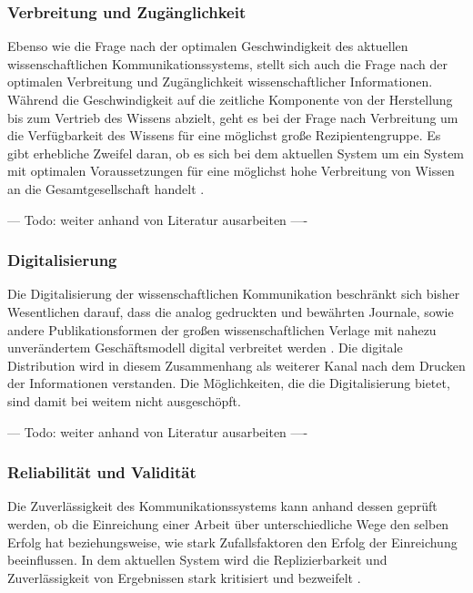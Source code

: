 \subsubsection{Verbreitung und Zugänglichkeit}

Ebenso wie die Frage nach der optimalen Geschwindigkeit des aktuellen wissenschaftlichen Kommunikationssystems, stellt sich auch die Frage nach der optimalen Verbreitung und Zugänglichkeit wissenschaftlicher Informationen. Während die Geschwindigkeit auf die zeitliche Komponente von der Herstellung bis zum Vertrieb des Wissens abzielt, geht es bei der Frage nach Verbreitung um die Verfügbarkeit des Wissens für eine möglichst große Rezipientengruppe. Es gibt erhebliche Zweifel daran, ob es sich bei dem aktuellen System um ein System mit optimalen Voraussetzungen für eine möglichst hohe Verbreitung von Wissen an die Gesamtgesellschaft handelt \cite{suchen}.

--- Todo: weiter anhand von Literatur ausarbeiten ----

\subsubsection{Digitalisierung}

Die Digitalisierung der wissenschaftlichen Kommunikation beschränkt sich bisher Wesentlichen darauf, dass die analog gedruckten und bewährten Journale, sowie andere Publikationsformen der großen wissenschaftlichen Verlage mit nahezu unverändertem Geschäftsmodell digital verbreitet werden \cite{Hanekop_2014}. Die digitale Distribution wird in diesem Zusammenhang als weiterer Kanal nach dem Drucken der Informationen verstanden. Die Möglichkeiten, die die Digitalisierung bietet, sind damit bei weitem nicht ausgeschöpft.

--- Todo: weiter anhand von Literatur ausarbeiten ----

\subsubsection{Reliabilität und Validität}

Die Zuverlässigkeit des Kommunikationssystems kann anhand dessen geprüft werden, ob die Einreichung einer Arbeit über unterschiedliche Wege den selben Erfolg hat beziehungsweise, wie stark Zufallsfaktoren den Erfolg der Einreichung beeinflussen. In dem aktuellen System wird die Replizierbarkeit und Zuverlässigkeit von Ergebnissen stark kritisiert und bezweifelt \cite{suchen}.

